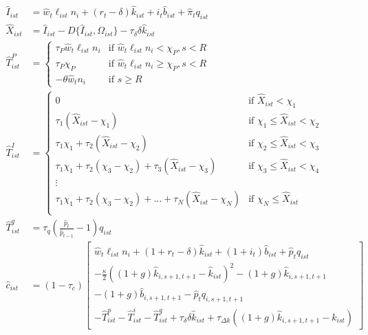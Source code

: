 \documentclass[letterpaper,12pt]{article}
\theoremstyle{definition}
\numberwithin{equation}{section}
\begin{document}
\begin{spacing}{1.5}
      \begin{align}
      \hat I_{ist} & = \hat w_t \ell_{ist} n_i + (r_t-\delta) \hat k_{ist} + i_t \hat b_{ist} + \hat \pi_t q_{ist}  \\
      \hat X_{ist} & = \hat I_{ist} - D\{\hat I_{ist},\Omega_{ist}\} -\tau_\delta \delta \hat k_{ist} \\
      \hat T^P_{ist} & = \left\{ \begin{matrix} \tau_P \hat w_t \ell_{ist} n_i & \text{if } \hat w_t \ell_{ist} n_i < \chi_P, s<R \\
                                         \tau_P \chi_P & \text{if } \hat w_t \ell_{ist} n_i \ge \chi_P, s<R \\
                                         -\theta \hat w_t n_i & \text{if } s\ge R
                                         \end{matrix} \right. \\
      \hat T^I_{ist} & = \left\{ \begin{matrix} 0 & \text{if } \hat X_{ist} < \chi_1 \\
                  \tau_1 (\hat X_{ist} - \chi_1) & \text{if }  \chi_1 \le \hat X_{ist} < \chi_2 \\
                  \tau_1 \chi_1 + \tau_2 (\hat X_{ist} - \chi_2) & \text{if }  \chi_2 \le \hat X_{ist} < \chi_3 \\
                  \tau_1 \chi_1 + \tau_2 (\chi_3 - \chi_2) + \tau_3 (\hat X_{ist} - \chi_3) & \text{if }  \chi_3 \le \hat X_{ist} < \chi_4 \\
                  \vdots \\
                  \tau_1 \chi_1 + \tau_2 (\chi_3 - \chi_2) +\dots+ \tau_N (\hat X_{ist} - \chi_N) & \text{if }  \chi_N \le \hat X_{ist} \\
                  \end{matrix} \right. \\
      \hat T^q_{ist} & = \tau_q \left(\tfrac{\hat p_t}{\hat p_{t-1}}-1 \right) q_{ist} \\
      \hat c_{ist} & = (1-\tau_c)\begin{bmatrix} \hat w_t \ell_{ist} n_i + (1+r_t-\delta)\hat k_{ist} + (1+i_t)\hat b_{ist} + \hat p_t q_{ist} \\
        - \tfrac{\kappa}{2}\left((1+g)\hat k_{i,s+1,t+1} - \hat k_{ist}\right)^2 - (1+g)\hat k_{i,s+1,t+1}\\ - (1+g) \hat b_{i,s+1,t+1} - \hat p_t q_{i,s+1,t+1} \\
        - \hat T^p_{ist} - \hat T^i_{ist} - \hat T^q_{ist} + \tau_\delta \delta \hat k_{ist} + \tau_{\Delta k} \left((1+g)\hat k_{i,s+1,t+1} - k_{ist}\right) \end{bmatrix}\\

\end{align}
\end{spacing}
\end{document}
